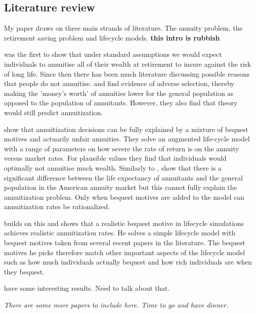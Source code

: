 \documentclass[12pt]{article}
\begin{document}
\subsection{Literature review}
My paper draws on three main strands of literature. The annuity problem, the retirement saving
problem and lifecycle models. \textbf{this intro is rubbish}

\cite{yaari_65} was the first to show that under standard assumptions we would expect individuals to
annuitise all of their wealth at retirement to insure against the risk of long life. Since then there
has been much literature discussing possible reasons that people do not annuitise. \cite{finkelstein_porteba_2002}
and \cite{finkelstein_porteba_2004} find evidence of adverse selection, thereby making the 'money's worth'
of annuities lower for the general population as opposed to the population of annuitants. However, they
also find that theory would still predict annuitization.

\cite{friedman_warshawsky_qje_1990} show that annuitization decisions can be fully explained by a mixture of
bequest motives and actuarily unfair annuities. They solve an augmented life-cycle model with a range of
parameters on how severe the rate of return is on the annuity versus market rates. For plausible values
they find that individuals would optimally not annuitise much wealth. Similarly to \cite{finkelstein_porteba_2004},
\cite{friedman_warshawsky_chicago_1988} show that there is a significant difference between the life expectancy of
annuitants and the general population in the American annuity market but this cannot fully explain the annuitization
problem. Only when bequest motives are added to the model can annuitization rates be rationalized.

\cite{lockwood_red_2012} builds on this and shows that a realistic bequest motive in lifecycle simulations achieves
realistic annuitization rates. He solves a simple lifecycle model with bequest motives taken from several recent papers
in the literature. The bequest motives he picks therefore match other important aspects of the lifecycle model such
as how much individuals actually bequest and how rich individuals are when they bequest.

\cite{lockwood_aer_2018}

\cite{vidalmelia_lejarragagarcia_munich_2004} have some interesting results. Need to talk about that.

\textit{There are some more papers to include here. Time to go and have dinner. }
\end{document}

